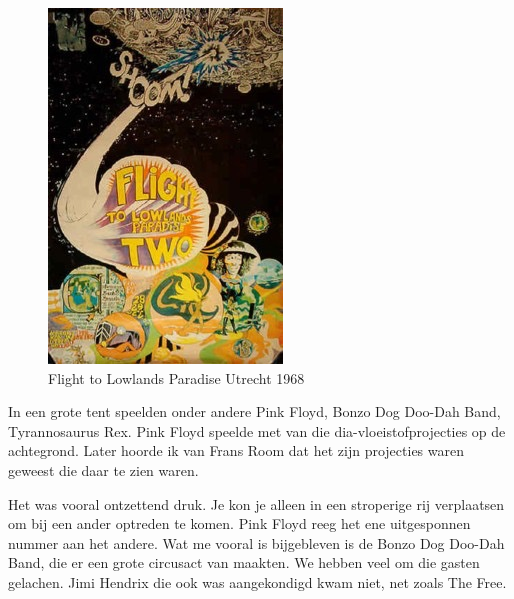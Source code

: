 \documentclass[12pt,twoside, openright]{memoir}
\begin{document}
\begin{figure}
\includegraphics[width=\textwidth]{img/ch31/posterkleur68235}
\caption*{\footnotesize Flight to Lowlands Paradise Utrecht 1968}
\end{figure}

In een grote tent speelden onder andere Pink Floyd, Bonzo Dog Doo-Dah Band, Tyrannosaurus Rex. Pink Floyd speelde met van die dia-vloeistofprojecties op de achtegrond. Later hoorde ik van Frans Room dat het zijn projecties waren geweest die daar te zien waren.

Het was vooral ontzettend druk. Je kon je alleen in een stroperige rij verplaatsen om bij een ander optreden te komen. 
Pink Floyd reeg het ene uitgesponnen nummer aan het andere. Wat me vooral is bijgebleven is de Bonzo Dog Doo-Dah Band, die er een grote circusact van maakten. We hebben veel om die gasten gelachen. Jimi Hendrix die ook was aangekondigd kwam niet, net zoals The Free.
\end{document}

